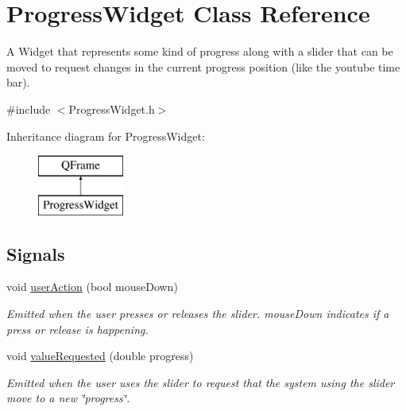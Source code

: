 \hypertarget{class_progress_widget}{\section{Progress\-Widget Class Reference}
\label{class_progress_widget}
}


A Widget that represents some kind of progress along with a slider that can be moved to request changes in the current progress position (like the youtube time bar).  




{\ttfamily \#include $<$Progress\-Widget.\-h$>$}

Inheritance diagram for Progress\-Widget\-:\begin{figure}[H]
\begin{center}
\leavevmode
\includegraphics[height=2.000000cm]{class_progress_widget}
\end{center}
\end{figure}
\subsection*{Signals}
\begin{DoxyCompactItemize}
\item 
\hypertarget{class_progress_widget_a032ab06d4fe2ef40c91b562d1063e183}{void \hyperlink{class_progress_widget_a032ab06d4fe2ef40c91b562d1063e183}{user\-Action} (bool mouse\-Down)}\label{class_progress_widget_a032ab06d4fe2ef40c91b562d1063e183}

\begin{DoxyCompactList}\small\item\em Emitted when the user presses or releases the slider. mouse\-Down indicates if a press or release is happening. \end{DoxyCompactList}\item 
\hypertarget{class_progress_widget_ae040b1c6fa7e8eae6c7b3732ac99c7d0}{void \hyperlink{class_progress_widget_ae040b1c6fa7e8eae6c7b3732ac99c7d0}{value\-Requested} (double progress)}\label{class_progress_widget_ae040b1c6fa7e8eae6c7b3732ac99c7d0}

\begin{DoxyCompactList}\small\item\em Emitted when the user uses the slider to request that the system using the slider move to a new \char`\"{}progress\char`\"{}. \end{DoxyCompactList}\end{DoxyCompactItemize}
